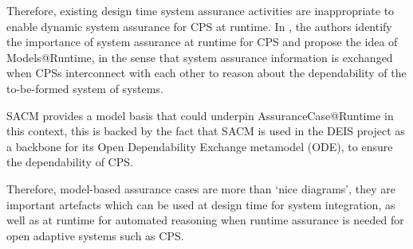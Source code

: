 Therefore, existing design time system assurance activities are inappropriate to enable dynamic system assurance for CPS at runtime. 
In \cite{trapp2013safety}, the authors identify the importance of system assurance at runtime for CPS and propose the idea of Models@Runtime, in the sense that system assurance information is exchanged when CPSs interconnect with each other to reason about the dependability of the to-be-formed system of systems.

SACM provides a model basis that could underpin AssuranceCase@Runtime in this context, this is backed by the fact that SACM is used in the DEIS project \cite{wei2017deis} as a backbone for its Open Dependability Exchange metamodel (ODE), to ensure the dependability of CPS. 




%
Therefore, model-based assurance cases are more than `nice diagrams', they are important artefacts which can be used at design time for system integration, as well as at runtime for automated reasoning when runtime assurance is needed for open adaptive systems such as CPS. 

